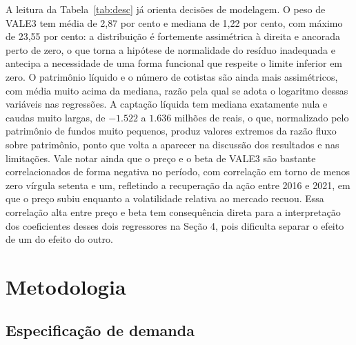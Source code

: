 \documentclass[12pt,a4paper]{article}
\begin{document}
A leitura da Tabela~\ref{tab:desc} já orienta decisões de modelagem. O peso de VALE3 tem média
de 2,87 por cento e mediana de 1,22 por cento, com máximo de 23,55 por cento: a distribuição é
fortemente assimétrica à direita e ancorada perto de zero, o que torna a hipótese de
normalidade do resíduo inadequada e antecipa a necessidade de uma forma funcional que respeite
o limite inferior em zero. O patrimônio líquido e o número de cotistas são ainda mais
assimétricos, com média muito acima da mediana, razão pela qual se adota o logaritmo dessas
variáveis nas regressões. A captação líquida tem mediana exatamente nula e caudas muito largas,
de $-1.522$ a $1.636$ milhões de reais, o que, normalizado pelo patrimônio de fundos muito
pequenos, produz valores extremos da razão fluxo sobre patrimônio, ponto que volta a aparecer
na discussão dos resultados e nas limitações. Vale notar ainda que o preço e o beta de VALE3 são
bastante correlacionados de forma negativa no período, com correlação em torno de menos zero
vírgula setenta e um, refletindo a recuperação da ação entre 2016 e 2021, em que o preço subiu
enquanto a volatilidade relativa ao mercado recuou. Essa correlação alta entre preço e beta tem
consequência direta para a interpretação dos coeficientes desses dois regressores na Seção 4,
pois dificulta separar o efeito de um do efeito do outro.

\section{Metodologia}

\subsection{Especificação de demanda}
\end{document}
